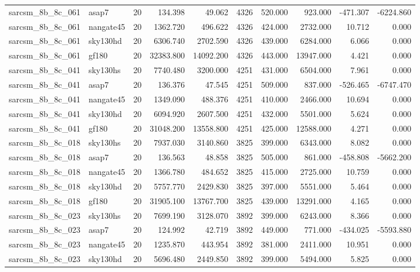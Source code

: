 \begin{longtable}{llrrrrrrrr}
sarcsm\_8b\_8c\_061 & asap7 & 20 & 134.398 & 49.062 & 4326 & 520.000 & 923.000 & -471.307 & -6224.860 \\
sarcsm\_8b\_8c\_061 & nangate45 & 20 & 1362.720 & 496.622 & 4326 & 424.000 & 2732.000 & 10.712 & 0.000 \\
sarcsm\_8b\_8c\_061 & sky130hd & 20 & 6306.740 & 2702.590 & 4326 & 439.000 & 6284.000 & 6.066 & 0.000 \\
sarcsm\_8b\_8c\_061 & gf180 & 20 & 32383.800 & 14092.200 & 4326 & 443.000 & 13947.000 & 4.421 & 0.000 \\
sarcsm\_8b\_8c\_041 & sky130hs & 20 & 7740.480 & 3200.000 & 4251 & 431.000 & 6504.000 & 7.961 & 0.000 \\
sarcsm\_8b\_8c\_041 & asap7 & 20 & 136.376 & 47.545 & 4251 & 509.000 & 837.000 & -526.465 & -6747.470 \\
sarcsm\_8b\_8c\_041 & nangate45 & 20 & 1349.090 & 488.376 & 4251 & 410.000 & 2466.000 & 10.694 & 0.000 \\
sarcsm\_8b\_8c\_041 & sky130hd & 20 & 6094.920 & 2607.500 & 4251 & 432.000 & 5501.000 & 5.624 & 0.000 \\
sarcsm\_8b\_8c\_041 & gf180 & 20 & 31048.200 & 13558.800 & 4251 & 425.000 & 12588.000 & 4.271 & 0.000 \\
sarcsm\_8b\_8c\_018 & sky130hs & 20 & 7937.030 & 3140.860 & 3825 & 399.000 & 6343.000 & 8.082 & 0.000 \\
sarcsm\_8b\_8c\_018 & asap7 & 20 & 136.563 & 48.858 & 3825 & 505.000 & 861.000 & -458.808 & -5662.200 \\
sarcsm\_8b\_8c\_018 & nangate45 & 20 & 1366.780 & 484.652 & 3825 & 415.000 & 2725.000 & 10.759 & 0.000 \\
sarcsm\_8b\_8c\_018 & sky130hd & 20 & 5757.770 & 2429.830 & 3825 & 397.000 & 5551.000 & 5.464 & 0.000 \\
sarcsm\_8b\_8c\_018 & gf180 & 20 & 31905.100 & 13767.700 & 3825 & 439.000 & 13291.000 & 4.165 & 0.000 \\
sarcsm\_8b\_8c\_023 & sky130hs & 20 & 7699.190 & 3128.070 & 3892 & 399.000 & 6243.000 & 8.366 & 0.000 \\
sarcsm\_8b\_8c\_023 & asap7 & 20 & 124.992 & 42.719 & 3892 & 449.000 & 771.000 & -434.025 & -5593.880 \\
sarcsm\_8b\_8c\_023 & nangate45 & 20 & 1235.870 & 443.954 & 3892 & 381.000 & 2411.000 & 10.951 & 0.000 \\
sarcsm\_8b\_8c\_023 & sky130hd & 20 & 5696.480 & 2449.850 & 3892 & 399.000 & 5494.000 & 5.825 & 0.000 \\

\end{longtable}
